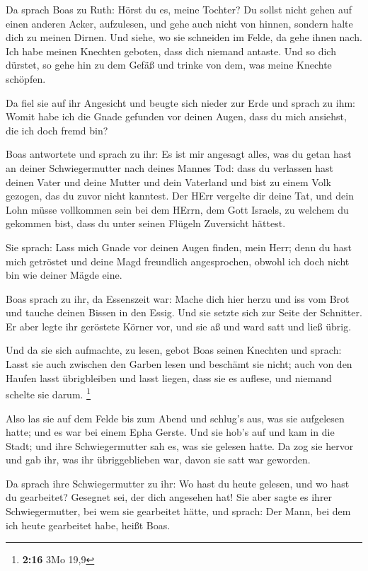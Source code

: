  Da sprach Boas zu Ruth: Hörst du es, meine Tochter? Du
sollst nicht gehen auf einen anderen Acker, aufzulesen, und gehe auch
nicht von hinnen, sondern halte dich zu meinen Dirnen.  Und
siehe, wo sie schneiden im Felde, da gehe ihnen nach. Ich habe meinen
Knechten geboten, dass dich niemand antaste. Und so dich dürstet, so
gehe hin zu dem Gefäß und trinke von dem, was meine Knechte schöpfen.

 Da fiel sie auf ihr Angesicht und beugte sich nieder zur
Erde und sprach zu ihm: Womit habe ich die Gnade gefunden vor deinen
Augen, dass du mich ansiehst, die ich doch fremd bin?

 Boas antwortete und sprach zu ihr: Es ist mir angesagt
alles, was du getan hast an deiner Schwiegermutter nach deines Mannes
Tod: dass du verlassen hast deinen Vater und deine Mutter und dein
Vaterland und bist zu einem Volk gezogen, das du zuvor nicht kanntest.
 Der HErr vergelte dir deine Tat, und dein Lohn müsse
vollkommen sein bei dem HErrn, dem Gott Israels, zu welchem du gekommen
bist, dass du unter seinen Flügeln Zuversicht hättest.

 Sie sprach: Lass mich Gnade vor deinen Augen finden, mein
Herr; denn du hast mich getröstet und deine Magd freundlich
angesprochen, obwohl ich doch nicht bin wie deiner Mägde eine.

 Boas sprach zu ihr, da Essenszeit war: Mache dich hier
herzu und iss vom Brot und tauche deinen Bissen in den Essig. Und sie
setzte sich zur Seite der Schnitter. Er aber legte ihr geröstete Körner
vor, und sie aß und ward satt und ließ übrig.

 Und da sie sich aufmachte, zu lesen, gebot Boas seinen
Knechten und sprach: Lasst sie auch zwischen den Garben lesen und
beschämt sie nicht;  auch von den Haufen lasst übrigbleiben
und lasst liegen, dass sie es auflese, und niemand schelte sie darum.
\footnote{\textbf{2:16} 3Mo 19,9}

 Also las sie auf dem Felde bis zum Abend und schlug's aus,
was sie aufgelesen hatte; und es war bei einem Epha Gerste.
 Und sie hob's auf und kam in die Stadt; und ihre
Schwiegermutter sah es, was sie gelesen hatte. Da zog sie hervor und gab
ihr, was ihr übriggeblieben war, davon sie satt war geworden.

 Da sprach ihre Schwiegermutter zu ihr: Wo hast du heute
gelesen, und wo hast du gearbeitet? Gesegnet sei, der dich angesehen
hat! Sie aber sagte es ihrer Schwiegermutter, bei wem sie gearbeitet
hätte, und sprach: Der Mann, bei dem ich heute gearbeitet habe, heißt
Boas.

